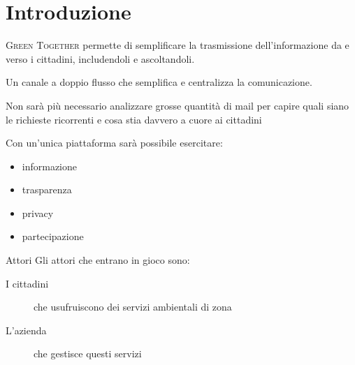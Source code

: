 \section{Introduzione}
\begin{frame}{}

  \textsc{Green Together} permette di semplificare la trasmissione dell'informazione da e verso i cittadini, includendoli e ascoltandoli.
  \pause
  \bigskip

  Un canale a doppio flusso che semplifica e centralizza la comunicazione.

\end{frame}
\begin{frame}
  Non sarà più necessario analizzare grosse quantità di mail per capire quali siano le richieste ricorrenti e cosa stia davvero a cuore ai cittadini
  \pause

  Con un'unica piattaforma sarà possibile esercitare:
  \begin{itemize}
    \item informazione
    \item trasparenza
    \item privacy
    \item partecipazione
  \end{itemize}

\end{frame}
\begin{frame}{Attori}
  Gli attori che entrano in gioco sono:
  \begin{description}
    \item[I cittadini] che usufruiscono dei servizi ambientali di zona
    \item[L'azienda] che gestisce questi servizi
  \end{description}


\end{frame}


